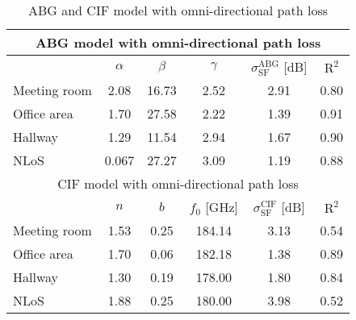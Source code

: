 \documentclass[conference]{IEEEtran}
\begin{document}
\begin{table}[htbp]
  \centering
  \caption{ABG and CIF model with omni-directional path loss}
    \begin{tabular}{|l|c|c|c|c|c|}
    \hline
    \multicolumn{6}{|c|}{ABG model with omni-directional path loss}  \\
    \hline
          & \multicolumn{1}{c|}{$\alpha$} & \multicolumn{1}{c|}{$\beta$} & \multicolumn{1}{c|}{$\gamma$} & \multicolumn{1}{c|}{$\sigma_{\text{SF}}^{\text{ABG}}$ [dB]} & \multicolumn{1}{c|}{$\text{R}^2$}  \\
    \hline
    Meeting room & 2.08  & 16.73 & 2.52  & 2.91  & 0.80  \\
    \hline
    Office area & 1.70  & 27.58 & 2.22  & 1.39  & 0.91  \\
    \hline
    Hallway & 1.29  & 11.54 & 2.94  & 1.67  & 0.90  \\
    \hline
    NLoS  & 0.067 & 27.27 & 3.09  & 1.19  & 0.88  \\
    \hline
    \multicolumn{6}{|c|}{CIF model with omni-directional path loss}  \\
    \hline
          & \multicolumn{1}{c|}{$n$} & \multicolumn{1}{c|}{$b$} & \multicolumn{1}{c|}{$f_0$ [GHz]} & \multicolumn{1}{c|}{$\sigma_{\text{SF}}^{\text{CIF}}$ [dB]} & \multicolumn{1}{c|}{$\text{R}^2$}  \\
    \hline
    Meeting room & 1.53  & 0.25  & 184.14 & 3.13  & 0.54  \\
    \hline
    Office area & 1.70  & 0.06  & 182.18 & 1.38  & 0.89  \\
    \hline
    Hallway & 1.30  & 0.19  & 178.00 & 1.80  & 0.84  \\
    \hline
    NLoS  & 1.88  & 0.25  & 180.00  & 3.98  & 0.52  \\
    \hline
    \end{tabular}%
  \label{tab:MF-omni}%
\end{table}%
\end{document}
